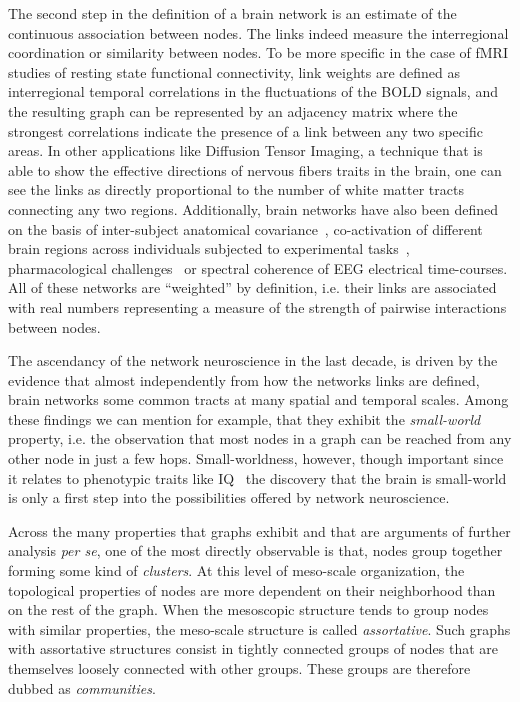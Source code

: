 The second step in the definition of a brain network is an estimate of the continuous association between nodes. The links indeed measure the interregional coordination or similarity between nodes.
To be more specific in the case of fMRI studies of resting state functional connectivity, link weights are defined as interregional temporal correlations in the fluctuations of the BOLD signals, and the resulting graph can be represented by an adjacency matrix where the strongest correlations indicate the presence of a link between any two specific areas.
In other applications like Diffusion Tensor Imaging, a technique that is able to show the effective directions of nervous fibers traits in the brain, one can see the links as directly proportional to the number of white matter tracts connecting any two regions.
Additionally, brain networks have also been defined on the basis of inter-subject anatomical covariance~\cite{Evans2013,he2007}, co-activation of different brain regions across individuals subjected to experimental tasks~\cite{crossley2013a}, pharmacological challenges~\cite{Schwarz2007,schwarz2008} or  spectral coherence of EEG electrical time-courses.
All of these networks are ``weighted'' by definition, i.e. their links are associated with real numbers representing a measure of the strength of pairwise interactions between nodes.

The ascendancy of the network neuroscience in the last decade, is driven by the evidence that almost independently from how the networks links are defined, brain networks some common tracts at many spatial and temporal scales.
Among these findings we can mention for example, that they exhibit the \emph{small-world}~\cite{Watts1998,sporns2002} property, i.e. the observation that most nodes in a graph can be reached from any other node in just a few hops. Small-worldness, however, though important since it relates to phenotypic traits like IQ~\cite{}  the discovery that the brain is small-world is only a first step into the possibilities offered by network neuroscience.

\bigbreak
Across the many properties that graphs exhibit and that are arguments of further analysis \emph{per se}, one of the most directly observable is that, nodes group together forming some kind of \emph{clusters}.
At this level of meso-scale organization, the topological properties of nodes are more dependent on their neighborhood than on the rest of the graph. When the mesoscopic structure tends to group nodes with similar properties, the meso-scale structure is called \emph{assortative}. Such graphs with assortative structures consist in tightly connected groups of nodes that are themselves loosely connected with other groups. These groups are therefore dubbed as \emph{communities}. 

